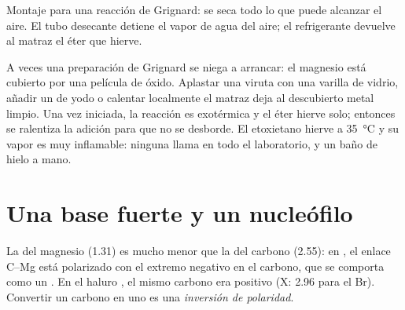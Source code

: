 \begin{omfigure}

{\small Montaje para una reacción de Grignard: se seca todo lo que puede
alcanzar el aire. El tubo desecante detiene el vapor de agua del aire; el
refrigerante devuelve al matraz el éter que hierve.}
\end{omfigure}

\begin{inthelab}
A veces una preparación de Grignard se niega a arrancar: el magnesio está
cubierto por una película de óxido. Aplastar una viruta con una varilla
de vidrio, añadir un  de yodo o calentar localmente el matraz deja
al descubierto metal limpio. Una vez iniciada, la reacción es exotérmica y
el éter hierve solo; entonces se ralentiza la adición para que no se
desborde. El etoxietano hierve a \qty{35}{\celsius} y su vapor es muy
inflamable: ninguna llama en todo el laboratorio, y un baño de hielo a
mano.
\end{inthelab}

\section{Una base fuerte y un nucleófilo}

\begin{definition}\label{def:b1:organomagnesium:umpolung}
La  del magnesio (1.31) es mucho menor que la del
carbono (2.55): en , el enlace C--Mg está polarizado con el
extremo negativo en el carbono, que se comporta como un . En el
haluro , el mismo carbono era positivo (X: 2.96 para el Br).
Convertir un carbono  en uno  es una \emph{inversión
de polaridad}.
\end{definition}

